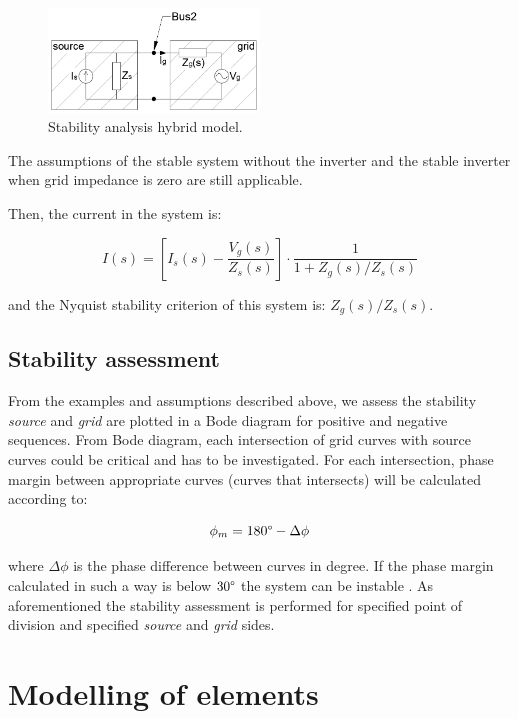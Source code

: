 \documentclass[12pt]{report} %
\begin{document}
\begin{figure}[htb]
	\centering
    	\includegraphics[width=0.5\textwidth]{img/theory/stability_model3.png}
  	\caption{Stability analysis hybrid model.}
  	\label{fig:stabilitymodel3}
\end{figure}
\FloatBarrier

The assumptions of the stable system without the inverter and the stable inverter when grid impedance is zero are still applicable.

Then, the current in the system is:

\begin{equation} \label{eq:stab3}
	I(s)=\left [ I_s(s)-\frac{V_g (s)}{Z_s (s)} \right ]\cdot \frac{1}{1+Z_g (s)/Z_s (s)}
\end{equation}

and the Nyquist stability criterion of this system is: $Z_g (s)/Z_s (s)$.

\section{Stability assessment} \label{sec:stabilityassessment}
From the examples and assumptions described above, we assess the stability \textit{source} and \textit{grid} are plotted in a Bode diagram for positive and negative sequences. From Bode diagram, each intersection of grid curves with source curves could be critical and has to be investigated. For each intersection, phase margin between appropriate curves (curves that intersects) will be calculated according to:

\begin{equation}
	\phi_m =180\degree-\Delta \phi
\end{equation}

where $\Delta \phi$ is the phase difference between curves in degree. If the phase margin calculated in such a way is below $30\degree$ the system can be instable \cite{borwin1}. As aforementioned the stability assessment is performed for specified point of division and specified \textit{source} and \textit{grid} sides.

\chapter{Modelling of elements} \label{sec:modellingofelements}
\end{document}
